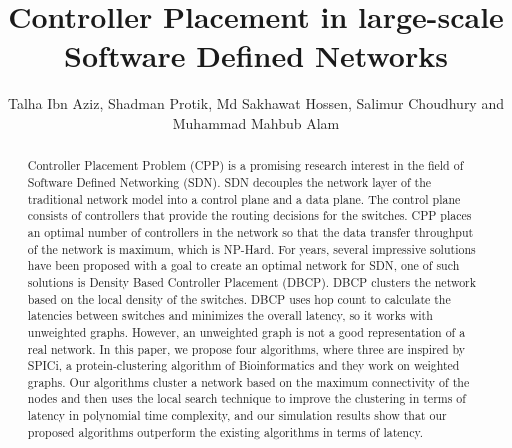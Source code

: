 \documentclass[times]{dacauth}
\begin{document}

\title{Controller Placement in large-scale Software Defined Networks}

\author{Talha Ibn Aziz, Shadman Protik, Md Sakhawat Hossen, Salimur Choudhury and Muhammad Mahbub Alam}

\address{Department of Computer Science and Engineering, IUT, Dhaka, Bangladesh and Department of Computer Science, Lakehead University, Thunder Bay, Ontario, Canada}


\vspace {-0.5cm}
\begin{abstract}

\noindent 
Controller Placement Problem (CPP) is a promising research interest in the field of Software Defined Networking (SDN). SDN decouples the network layer of the traditional network model into a control plane and a data plane. The control plane consists of controllers that provide the routing decisions for the switches. CPP places an optimal number of controllers in the network so that the data transfer throughput of the network is maximum, which is NP-Hard. For years, several impressive solutions have been proposed with a goal to create an optimal network for SDN, one of such solutions is Density Based Controller Placement (DBCP). DBCP clusters the network based on the local density of the switches. DBCP uses hop count to calculate the latencies between switches and minimizes the overall latency, so it works with unweighted graphs. However, an unweighted graph is not a good representation of a real network. In this paper, we propose four algorithms, where three are inspired by SPICi, a protein-clustering algorithm of Bioinformatics and they work on weighted graphs. Our algorithms cluster a network based on the maximum connectivity of the nodes and then uses the local search technique to improve the clustering in terms of latency in polynomial time complexity, and our simulation results show that our proposed algorithms outperform the existing algorithms in terms of latency.

\end{abstract}


\maketitle
\end{document}
